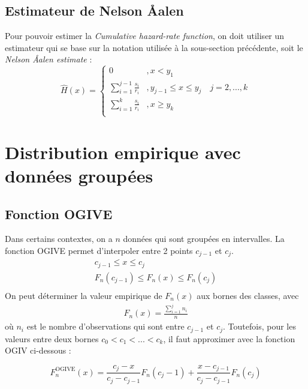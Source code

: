 \documentclass[12pt, french]{report}
\begin{document}
\subsection{Estimateur de Nelson \r{A}alen}
\label{subsec:nelson-Aalen}
Pour pouvoir estimer la \textit{Cumulative hazard-rate function}, on doit utiliser un estimateur qui se base sur la notation utilisée à la sous-section précédente, soit le \textit{Nelson \r{A}alen estimate} : 
\begin{equation}
\hat{H}(x) = 
\begin{cases}
0		& , x < y_1 \\
\sum_{i=1}^{j-1} \frac{s_i}{r_i}	& , y_{j-1} \leq x \leq y_j \quad j = 2, ..., k \\
\sum_{i=1}^{k} \frac{s_i}{r_i}		& , x \geq y_k \\
\end{cases}
\end{equation}

\section{Distribution empirique avec données groupées}

\subsection{Fonction OGIVE}


Dans certains contextes, on a $n$ données qui sont groupées en intervalles. La fonction OGIVE permet d'interpoler entre 2 points $c_{j-1}$ et $c_{j}$.
\begin{align*}
c_{j-1} 	 \leq x  \leq c_j \\
F_n(c_{j-1})	 \leq F_n(x)	 \leq F_n(c_j) \\
\end{align*}
On peut déterminer la valeur empirique de $F_n(x)$ aux bornes des classes, avec
\begin{align*}
F_n(x) = \frac{\sum_{i=1}^{j} n_i}{n}
\end{align*}
où $n_i$ est le nombre d'observations qui sont entre $c_{j-1}$ et $c_j$. Toutefois, pour les valeurs entre deux bornes $c_0 < c_1 < ... < c_k$, il faut approximer avec la fonction OGIV ci-dessous : 

\begin{equation}
\label{eq:repart-OGIVE}
F_n^{\text{OGIVE}}(x) = \frac{c_j - x}{c_j - c_{j-1}} F_n(c_j -1) + \frac{x - c_{j-1}}{c_j - c_{j-1}} F_n(c_j)
\end{equation}
\end{document}
